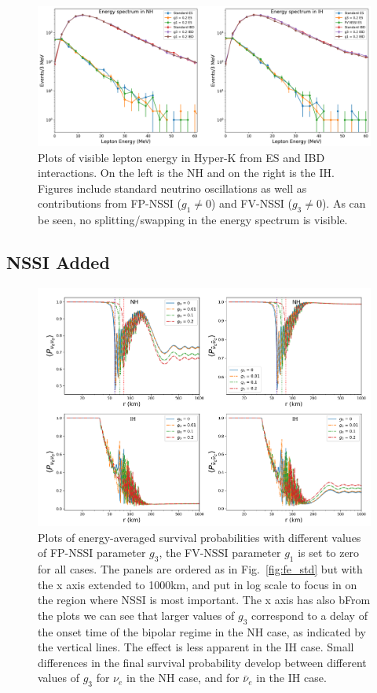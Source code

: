 \documentclass[a4paper,12pt]{article}
\begin{document}
\begin{figure}[h]
\begin{center}
\includegraphics[width=16cm]{lepton_energy.png}
\caption{Plots of visible lepton energy in Hyper-K from ES and IBD interactions. On the left is the NH and on the right is the IH. Figures include standard neutrino oscillations as well as contributions from FP-NSSI ($g_{1} \neq 0$) and FV-NSSI ($g_{3} \neq 0$). As can be seen, no splitting/swapping in the energy spectrum is visible.}
\label{fig:lepton_energy}
\end{center}
\end{figure}
\subsection{NSSI Added}
\begin{figure}[t]
\begin{center}
\includegraphics[width=14cm]{flavor_evo_fp_1km.png}
\caption{Plots of energy-averaged survival probabilities with different values of FP-NSSI parameter $g_3$, the FV-NSSI parameter $g_1$ is set to zero for all cases. The panels are ordered as in Fig.~\ref{fig:fe_std} but with the x axis extended to 1000km, and put in log scale to focus in on the region where NSSI is most important. The x axis has also bFrom the plots we can see that larger values of $g_3$ correspond to a delay of the onset time of the bipolar regime in the NH case, as indicated by the vertical lines. The effect is less apparent in the IH case. Small differences in the final survival probability develop between different values of $g_3$ for $\nu_e$ in the NH case, and for $\bar \nu_e$ in the IH case.}
\label{fig:fe_fp}
\end{center}
\end{figure}
\end{document}
